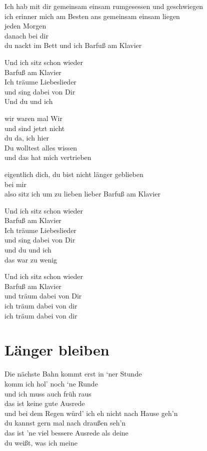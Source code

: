 \documentclass[]{book}
\begin{document}
Ich hab mit dir gemeinsam einsam rumgesessen und geschwiegen\\
ich erinner mich am Besten ans gemeinsam einsam liegen\\
jeden Morgen\\
danach bei dir\\
du nackt im Bett und ich Barfuß am Klavier

Und ich sitz schon wieder\\
Barfuß am Klavier\\
Ich träume Liebeslieder\\
und sing dabei von Dir\\
Und du und ich

wir waren mal Wir\\
und sind jetzt nicht\\
du da, ich hier\\
Du wolltest alles wissen\\
und das hat mich vertrieben

eigentlich dich, du bist nicht länger geblieben\\
bei mir\\
also sitz ich um zu lieben lieber Barfuß am Klavier

Und ich sitz schon wieder\\
Barfuß am Klavier\\
Ich träume Liebeslieder\\
und sing dabei von Dir\\
und du und ich\\
das war zu wenig

Und ich sitz schon wieder\\
Barfuß am Klavier\\
und träum dabei von Dir\\
ich träum dabei von dir\\
ich träum dabei von dir

\hypertarget{langer-bleiben-1}{%
\section{Länger bleiben}\label{langer-bleiben-1}}

Die nächste Bahn kommt erst in `ner Stunde\\
komm ich hol' noch `ne Runde\\
und ich muss auch früh raus\\
das ist keine gute Ausrede\\
und bei dem Regen würd' ich eh nicht nach Hause geh'n\\
du kannst gern mal nach draußen seh'n\\
das ist 'ne viel bessere Ausrede als deine\\
du weißt, was ich meine
\end{document}
